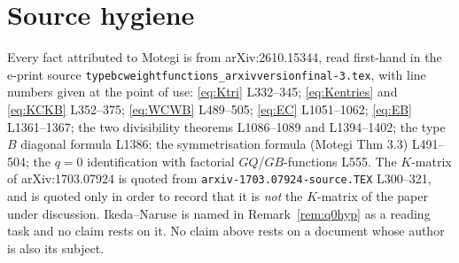 \documentclass[11pt]{article}
\theoremstyle{plain}
\theoremstyle{definition}
\theoremstyle{remark}
\theoremstyle{plain}
\begin{document}
\section*{Source hygiene}

Every fact attributed to Motegi is from arXiv:2610.15344, read first-hand in the
e-print source \texttt{typebcweightfunctions\_arxivversionfinal-3.tex}, with
line numbers given at the point of use:
\eqref{eq:Ktri} L332--345; \eqref{eq:Kentries} and \eqref{eq:KCKB} L352--375;
\eqref{eq:WCWB} L489--505; \eqref{eq:EC} L1051--1062; \eqref{eq:EB}
L1361--1367; the two divisibility theorems L1086--1089 and L1394--1402; the
type $B$ diagonal formula L1386; the symmetrisation formula (Motegi Thm 3.3)
L491--504; the $q=0$ identification with factorial $GQ$/$GB$-functions L555.
The $K$-matrix of arXiv:1703.07924 is quoted from
\texttt{arxiv-1703.07924-source.TEX} L300--321, and is quoted only in order to
record that it is \emph{not} the $K$-matrix of the paper under discussion.
Ikeda--Naruse is named in Remark~\ref{rem:q0hyp} as a reading task and no claim
rests on it.  No claim above rests on a document whose author is also its
subject.
\end{document}
